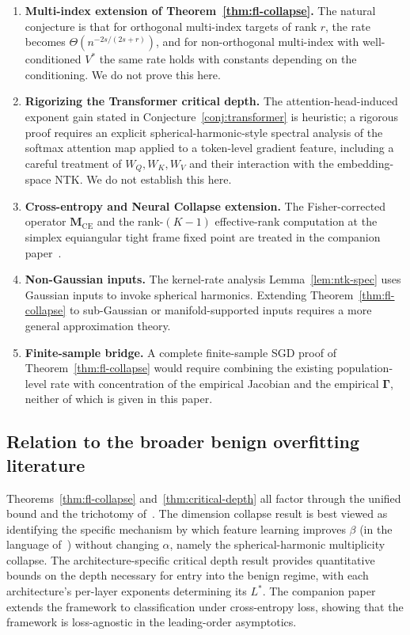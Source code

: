 \documentclass[12pt]{amsart}
\theoremstyle{definition}
\theoremstyle{remark}
\newcommand{\bM}{\mathbf{M}}
\newcommand{\bGamma}{\boldsymbol{\Gamma}}
\begin{document}
\begin{enumerate}
\item \textbf{Multi-index extension of Theorem~\ref{thm:fl-collapse}.}
  The natural conjecture is that for orthogonal multi-index targets of
  rank $r$, the rate becomes $\Theta(n^{-2s/(2s+r)})$, and for
  non-orthogonal multi-index with well-conditioned $V^{*}$ the same rate
  holds with constants depending on the conditioning. We do not prove this
  here.

\item \textbf{Rigorizing the Transformer critical depth.} The
  attention-head-induced exponent gain stated in
  Conjecture~\ref{conj:transformer} is heuristic; a rigorous proof
  requires an explicit spherical-harmonic-style spectral analysis of
  the softmax attention map applied to a token-level gradient feature,
  including a careful treatment of $W_{Q}, W_{K}, W_{V}$ and their
  interaction with the embedding-space NTK. We do not establish this
  here.

\item \textbf{Cross-entropy and Neural Collapse extension.} The
  Fisher-corrected operator $\bM_{\mathrm{CE}}$ and the rank-$(K-1)$
  effective-rank computation at the simplex equiangular tight frame
  fixed point are treated in the companion paper~\cite{paperD}.

\item \textbf{Non-Gaussian inputs.} The kernel-rate analysis
  Lemma~\ref{lem:ntk-spec} uses Gaussian inputs to invoke spherical
  harmonics. Extending Theorem~\ref{thm:fl-collapse} to sub-Gaussian or
  manifold-supported inputs requires a more general approximation theory.

\item \textbf{Finite-sample bridge.} A complete finite-sample SGD
  proof of Theorem~\ref{thm:fl-collapse} would require combining the
  existing population-level rate with concentration of the empirical
  Jacobian and the empirical $\bGamma$, neither of which is given in this
  paper.
\end{enumerate}

\subsection{Relation to the broader benign overfitting literature}

Theorems~\ref{thm:fl-collapse} and~\ref{thm:critical-depth} all factor
through the unified bound and the trichotomy of~\cite{paperA}. The
dimension collapse result is best viewed as identifying the specific
mechanism by which feature learning improves $\beta$ (in the language
of~\cite{paperA}) without changing $\alpha$, namely the spherical-harmonic
multiplicity collapse. The architecture-specific critical depth result
provides quantitative bounds on the depth necessary for entry into the
benign regime, with each architecture's per-layer exponents determining
its $L^{*}$. The companion paper~\cite{paperD} extends the framework to
classification under cross-entropy loss, showing that the framework is
loss-agnostic in the leading-order asymptotics.
\end{document}
